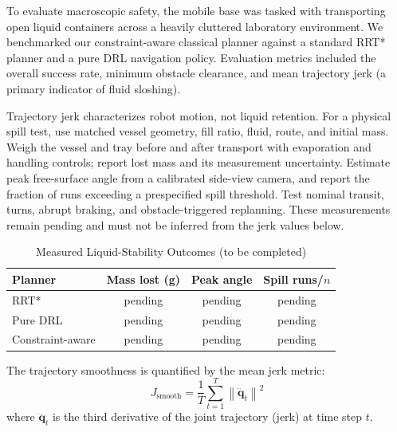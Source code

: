 To evaluate macroscopic safety, the mobile base was tasked with transporting open liquid containers across a heavily cluttered laboratory environment. We benchmarked our constraint-aware classical planner against a standard RRT* planner and a pure DRL navigation policy. Evaluation metrics included the overall success rate, minimum obstacle clearance, and mean trajectory jerk (a primary indicator of fluid sloshing).

Trajectory jerk characterizes robot motion, not liquid retention. For a physical spill test, use matched vessel geometry, fill ratio, fluid, route, and initial mass. Weigh the vessel and tray before and after transport with evaporation and handling controls; report lost mass and its measurement uncertainty. Estimate peak free-surface angle from a calibrated side-view camera, and report the fraction of runs exceeding a prespecified spill threshold. Test nominal transit, turns, abrupt braking, and obstacle-triggered replanning. These measurements remain pending and must not be inferred from the jerk values below.

\begin{table}[!t]
\caption{Measured Liquid-Stability Outcomes (to be completed)}
\label{tab:liquid_stability}
\centering
\begin{tabular}{lccc}
\hline\hline
\textbf{Planner} & \textbf{Mass lost (g)} & \textbf{Peak angle} & \textbf{Spill runs/$n$} \\ \hline
RRT* & pending & pending & pending \\
Pure DRL & pending & pending & pending \\
Constraint-aware & pending & pending & pending \\ \hline\hline
\end{tabular}
\end{table}

The trajectory smoothness is quantified by the mean jerk metric:
\begin{equation}
    J_{\text{smooth}} = \frac{1}{T} \sum_{t=1}^{T} \left\| \dddot{\mathbf{q}}_t \right\|^2
\end{equation}
where $\dddot{\mathbf{q}}_t$ is the third derivative of the joint trajectory (jerk) at time step $t$.

